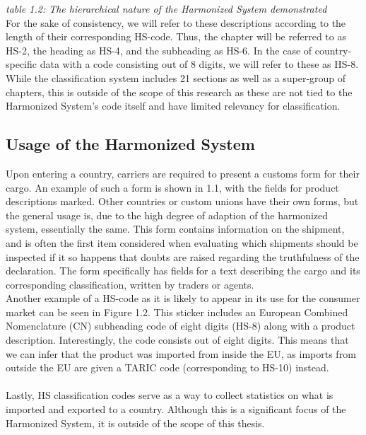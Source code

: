 \begin{center}
    
\end{center}
{\textit{table 1.2: The hierarchical nature of the Harmonized System demonstrated}} \\

For the sake of consistency, we will refer to these descriptions according to the length of their corresponding HS-code. Thus, the chapter will be referred to as HS-2, the heading as HS-4, and the subheading as HS-6. In the case of country-specific data with a code consisting out of 8 digits, we will refer to these as HS-8. While the classification system includes 21 sections as well as a super-group of chapters, this is outside of the scope of this research as these are not tied to the Harmonized System’s code itself and have limited relevancy for classification.

\subsection{Usage of the Harmonized System}
Upon entering a country, carriers are required to present a customs form for their cargo. An example of such a form is shown in 1.1, with the fields for product descriptions marked. Other countries or custom unions have their own forms, but the general usage is, due to the high degree of adaption of the harmonized system, essentially the same. This form contains information on the shipment, and is often the first item considered when evaluating which shipments should be inspected if it so happens that doubts are raised regarding the truthfulness of the declaration. The form specifically has fields for a text describing the cargo and its corresponding classification, written by traders or agents.
\\
Another example of a HS-code as it is likely to appear in its use for the consumer market can be seen in Figure 1.2. This sticker includes an European Combined Nomenclature (CN) subheading code of eight digits (HS-8) along with a product description. Interestingly, the code consists out of eight digits. This means that we can infer that the product was imported from inside the EU, as imports from outside the EU are given a TARIC code (corresponding to HS-10) instead.\\
\\
Lastly, HS classification codes serve as a way to collect statistics on what is imported and exported to a country. Although this is a significant focus of the Harmonized System, it is outside of the scope of this thesis.\\

